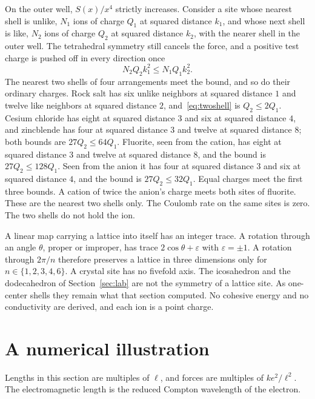 \documentclass[a4paper]{article}
\begin{document}
On the outer well, \(S(x)/x^{4}\) strictly increases. Consider a site whose nearest shell is unlike, \(N_{1}\) ions of charge \(Q_{1}\) at squared distance \(k_{1}\), and whose next shell is like, \(N_{2}\) ions of charge \(Q_{2}\) at squared distance \(k_{2}\), with the nearer shell in the outer well. The tetrahedral symmetry still cancels the force, and a positive test charge is pushed off in every direction once
\begin{equation}
\label{eq:twoshell}
N_{2}Q_{2}k_{1}^{2}\le N_{1}Q_{1}k_{2}^{2}.
\end{equation}
The nearest two shells of four arrangements meet the bound, and so do their ordinary charges. Rock salt has six unlike neighbors at squared distance \(1\) and twelve like neighbors at squared distance \(2\), and~\eqref{eq:twoshell} is \(Q_{2}\le 2Q_{1}\). Cesium chloride has eight at squared distance \(3\) and six at squared distance \(4\), and zincblende has four at squared distance \(3\) and twelve at squared distance \(8\); both bounds are \(27Q_{2}\le 64Q_{1}\). Fluorite, seen from the cation, has eight at squared distance \(3\) and twelve at squared distance \(8\), and the bound is \(27Q_{2}\le 128Q_{1}\). Seen from the anion it has four at squared distance \(3\) and six at squared distance \(4\), and the bound is \(27Q_{2}\le 32Q_{1}\). Equal charges meet the first three bounds. A cation of twice the anion's charge meets both sites of fluorite. These are the nearest two shells only. The Coulomb rate on the same sites is zero. The two shells do not hold the ion.

A linear map carrying a lattice into itself has an integer trace. A rotation through an angle \(\theta\), proper or improper, has trace \(2\cos\theta+\varepsilon\) with \(\varepsilon=\pm 1\). A rotation through \(2\pi/n\) therefore preserves a lattice in three dimensions only for \(n\in\{1,2,3,4,6\}\). A crystal site has no fivefold axis. The icosahedron and the dodecahedron of Section~\ref{sec:lab} are not the symmetry of a lattice site. As one-center shells they remain what that section computed. No cohesive energy and no conductivity are derived, and each ion is a point charge.

\section{A numerical illustration}
\label{sec:numbers}

Lengths in this section are multiples of \(\ell\), and forces are multiples of \(k e^{2}/\ell^{2}\). The electromagnetic length is the reduced Compton wavelength of the electron.
\end{document}
